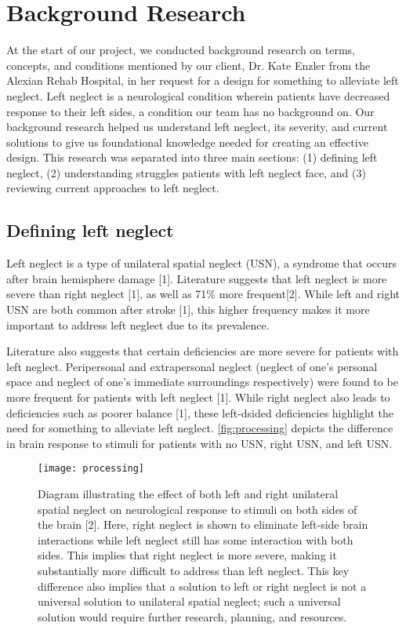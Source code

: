 \chapter{Background Research}
\label{chap:research}

At the start of our project, we conducted background research on terms,
concepts, and conditions mentioned by our client, Dr. Kate Enzler from the
Alexian Rehab Hospital, in her request for a design for something to alleviate
left neglect. Left neglect is a neurological condition wherein patients have
decreased response to their left sides, a condition our team has no background
on. Our background research helped us understand left neglect, its severity,
and current solutions to give us foundational knowledge needed for creating an
effective design. This research was separated into three main sections: (1)
defining left neglect, (2) understanding struggles patients with left neglect
face, and (3) reviewing current approaches to left neglect. 

\section{Defining left neglect}

Left neglect is a type of unilateral spatial neglect (USN), a syndrome that
occurs after brain hemisphere damage [1]. Literature suggests that left neglect
is more severe than right neglect [1], as well as 71\% more frequent[2]. While
left and right USN are both common after stroke [1], this higher frequency
makes it more important to address left neglect due to its prevalence.

Literature also suggests that certain deficiencies are more severe for patients
with left neglect. Peripersonal and extrapersonal neglect (neglect of one’s
personal space and neglect of one’s immediate surroundings respectively) were
found to be more frequent for patients with left neglect [1]. While right
neglect also leads to deficiencies such as poorer balance [1], these
left-dsided deficiencies highlight the need for something to alleviate left
neglect. \autoref{fig:processing} depicts the difference in brain response to
stimuli for patients with no USN, right USN, and left USN.

\begin{figure}[h]
  \centering
  \texttt{[image: processing]}
  \caption[Environment processing in the brain.]{Diagram illustrating the
    effect of both left and right unilateral spatial neglect on neurological
    response to stimuli on both sides of the brain [2]. Here, right neglect is
    shown to eliminate left-side brain interactions while left neglect still
    has some interaction with both sides. This implies that right neglect is
    more severe, making it substantially more difficult to address than left
    neglect. This key difference also implies that a solution to left or right
    neglect is not a universal solution to unilateral spatial neglect; such a
    universal solution would require further research, planning, and
    resources.}
  \label{fig:processing}
\end{figure}

